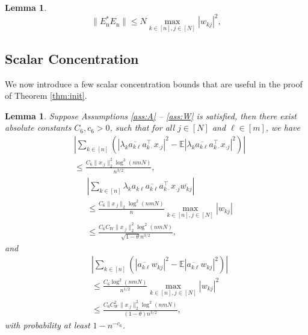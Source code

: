 \documentclass[11pt,journal]{IEEEtran}
\newcommand{\bbE}{\mathbb{E}}
\newcommand{\rmn}{\mathrm{n}}
\newcommand{\norm}[1]{\|{#1}\|}
\newcommand{\T}{\top}
\newtheorem{lemma}[theorem]{Lemma}
\begin{document}

\begin{lemma} \label{lem:EnstarEn}
\[
\norm{ E_\rmn^*E_\rmn } \leq N\max_{k\in[n], j\in[N]}|w_{kj}|^2,
\]
\end{lemma} 





\subsection{Scalar Concentration} \label{sec:scalar}

We now introduce a few scalar concentration bounds that are useful in the proof of Theorem \ref{thm:init}.

\begin{lemma} \label{lem:ineq_square}
Suppose Assumptions \ref{ass:A} -- \ref{ass:W} is satisfied, then there exist absolute constants $C_6, c_6>0$, such that for all $j\in[N]$ and $\ell\in[m]$, we have
\begin{align}
& \left| \sum_{k\in[n]} \left( | \lambda_k \overline{a_{k\ell}} a_{k\cdot}^\T x_{\cdot j}|^2 - \bbE | \lambda_k \overline{a_{k\ell}} a_{k\cdot}^\T x_{\cdot j}|^2\right) \right|  \nonumber \\
& \leq \frac{C_6 \norm{x_{\cdot j}}_2^2 \log^3 (nmN)}{n^{3/2}},  \label{eq:ineq1}
\end{align}
\begin{align}
& \left| \sum_{k\in[n]} \lambda_k a_{k\ell} \overline{a_{k\ell}} a_{k\cdot}^\T x_{\cdot j} \overline{w_{kj}}\right|  \nonumber \\
& \leq \frac{C_6 \norm{x_{\cdot j}}_2 \log^2 (nmN)}{n} \max_{k\in[n],j\in[N]} |w_{kj}| \nonumber \\
& \leq \frac{C_6 C_W \norm{x_{\cdot j}}_2^2 \log^2 (nmN)}{\sqrt{1-\theta} n^{3/2}}, \label{eq:ineq2}
\end{align}
and
\begin{align}
& \left| \sum_{k\in[n]} \left( | \overline{a_{k\ell}} w_{kj} |^2 - \bbE | \overline{a_{k\ell}} w_{kj} |^2 \right) \right|  \nonumber \\
& \leq \frac{C_6 \log^2 (nmN)}{n^{1/2}} \max_{k\in[n],j\in[N]} |w_{kj}|^2  \nonumber\\
& \leq \frac{C_6 C_W^2 \norm{x_{\cdot j}}_2^2 \log^2 (nmN)}{(1-\theta) n^{3/2}},  \label{eq:ineq3}
\end{align}
with probability at least $1-n^{-c_6}$.
\end{lemma}
\end{document}
